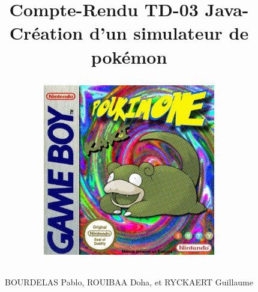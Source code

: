 \documentclass{report}
\begin{document}
\title{%
    \begin{minipage}\linewidth
        \centering
        Compte-Rendu TD-03 
        \vskip 3pt
        \large Java-Création d'un simulateur de pokémon
        \author{BOURDELAS Pablo, ROUIBAA Doha, et RYCKAERT Guillaume}
    \end{minipage}
\begin{figure}[ht!]
    \centering
    \includegraphics[width=75mm]{cover.jpg}
\end{figure}
    }   

\maketitle
\end{document}
